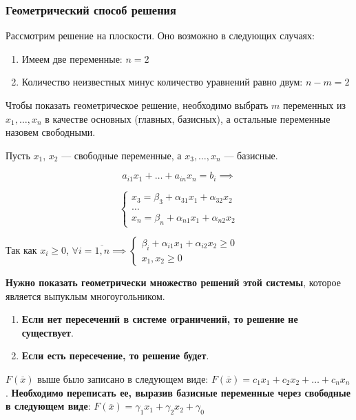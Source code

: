 \documentclass{article}
\begin{document}
\subsubsection{Геометрический способ решения}

Рассмотрим решение на плоскости. Оно возможно в следующих случаях:

\begin{enumerate}
    \item Имеем две переменные: $n = 2$
    \item Количество неизвестных минус количество уравнений равно двум: $n - m = 2$
\end{enumerate}

Чтобы показать геометрическое решение, необходимо выбрать $m$ переменных из $x_1, \dots, x_{n}$ в качестве основных (главных, базисных), а остальные переменные назовем свободными.

Пусть $x_1$, $x_2$ — свободные переменные, а $x_3, \dots, x_{n}$ — базисные.

$$
a_{i 1} x_{1} + \dots + a_{i n} x_{n} = b_{i} \implies
$$

$$
\begin{cases}
x_3 = \beta_{3} + \alpha_{3 1} x_1 + \alpha_{3 2} x_{2} \\
\dots \\
x_n = \beta_{n} + \alpha_{n 1} x_1 + \alpha_{n 2} x_{2}
\end{cases}
$$

Так как $x_{i} \ge 0$, $\forall i = \overline{1, n} \implies \begin{cases}
    \beta_{i} + \alpha_{i 1} x_1 + \alpha_{i 2} x_2 \ge 0 \\
    x_1, x_2 \ge 0
\end{cases}$

\textbf{Нужно показать геометрически множество решений этой системы}, которое является выпуклым многоугольником.

\begin{enumerate}
    \item \textbf{Если нет пересечений в системе ограничений, то решение не существует}.
    \item \textbf{Если есть пересечение, то решение будет}.
\end{enumerate}

$F(\overline{x})$ выше было записано в следующем виде: $F(\overline{x}) = c_1 x_1 + c_2 x_2 + \dots + c_n x_n$. \textbf{Необходимо переписать ее, выразив базисные переменные через свободные в следующем виде}: $F(\overline{x}) = \gamma_1 x_1 + \gamma_2 x_2 + \gamma_{0}$
\end{document}
